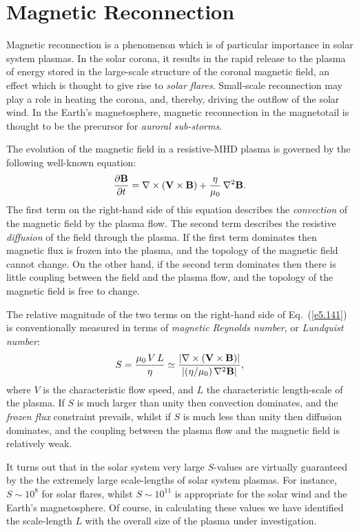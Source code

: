 \section{Magnetic Reconnection}
Magnetic reconnection is a phenomenon which is of particular importance in solar
system plasmas. In the solar corona, it results in the rapid release to the
plasma of energy stored in the large-scale structure of the coronal magnetic
field, an effect which is thought to give rise to {\em solar flares}. Small-scale
reconnection may play a role in heating the corona, and, thereby, driving
the outflow of the solar wind. In the Earth's magnetosphere, magnetic
reconnection in the magnetotail is thought to be
the precursor for {\em auroral sub-storms}.

The evolution of the magnetic field in a resistive-MHD plasma is
governed by the following well-known equation:
\begin{equation}\label{e5.141}
\frac{\partial{\bf B}}{\partial t} = \nabla\times({\bf V}\times{\bf B})+
\frac{\eta}{\mu_0}\,\nabla^2{\bf B}.
\end{equation}
The first term on the right-hand side of this equation describes the
{\em convection}\/ of the magnetic field by the plasma flow. The second
term describes the resistive {\em diffusion}\/ of the field through the plasma.
If the first term dominates then magnetic flux is frozen into the plasma,
and the topology of the magnetic field cannot change. On the other hand,
if the second term dominates then there is little coupling between the
field and the plasma flow, and 
the topology of the magnetic field
is free to change. 

The relative magnitude of the two terms on the right-hand side of Eq.~(\ref{e5.141})
is conventionally measured in terms of {\em magnetic Reynolds number}, or {\em Lundquist
number}:
\begin{equation}
S = \frac{\mu_0\,V\,L}{\eta} \simeq \frac{|\nabla\times({\bf V}\times {\bf B})|}
{|(\eta/\mu_0)\,\nabla^2{\bf B}|},
\end{equation}
where $V$ is the characteristic flow speed, and $L$  the characteristic
length-scale of the plasma. If $S$ is much larger than unity then
convection dominates, and the {\em frozen flux} constraint prevails, whilst
if $S$ is much less than unity then diffusion dominates, and the coupling between
the plasma flow and the magnetic field is relatively weak.

It turns out that in the solar system  very large $S$-values are virtually guaranteed by the
the extremely large scale-lengths of solar system plasmas. For instance,
$S\sim 10^8$ for solar flares, whilst $S\sim 10^{11}$ is appropriate for
the solar wind and the Earth's magnetosphere. Of course, in calculating 
these values we have identified the scale-length $L$ with the overall
size of the plasma under investigation. 

